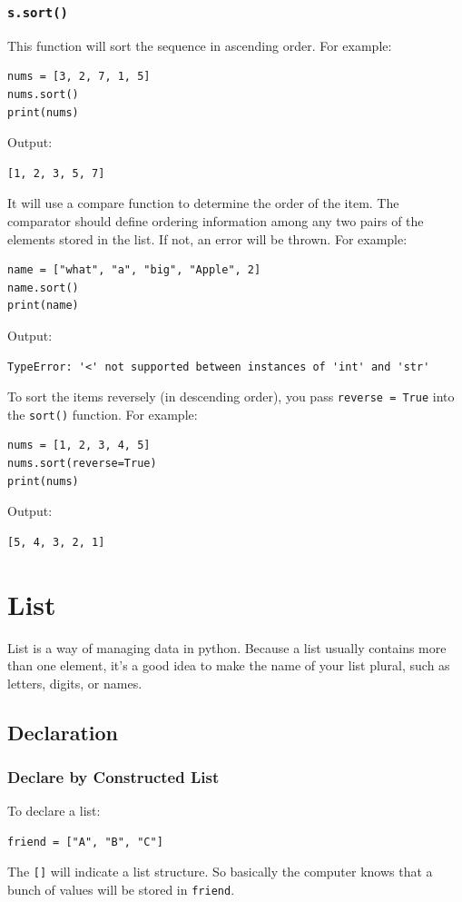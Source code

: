 \documentclass[12pt]{book}
\begin{document}
\subsubsection{\texttt{s.sort()}}
\label{sec:org6da2622}
This function will sort the sequence in ascending order. For example:
\begin{verbatim}
nums = [3, 2, 7, 1, 5]
nums.sort()
print(nums)
\end{verbatim}
Output:
\begin{verbatim}
[1, 2, 3, 5, 7]
\end{verbatim}

It will use a compare function to determine the order of the item. The comparator should define ordering information among any two pairs of the elements stored in the list. If not, an error will be thrown. For example:
\begin{verbatim}
name = ["what", "a", "big", "Apple", 2]
name.sort()
print(name)
\end{verbatim}
Output:
\begin{verbatim}
TypeError: '<' not supported between instances of 'int' and 'str'
\end{verbatim}

To sort the items reversely (in descending order), you pass \texttt{reverse = True} into the \texttt{sort()} function. For example:
\begin{verbatim}
nums = [1, 2, 3, 4, 5]
nums.sort(reverse=True)
print(nums)
\end{verbatim}
Output:
\begin{verbatim}
[5, 4, 3, 2, 1]
\end{verbatim}
\section{List}
\label{sec:orga586f46}
List is a way of managing data in python. Because a list usually contains more than one element, it’s a good idea to make the name of your list plural, such as letters, digits, or names.
\subsection{Declaration}
\label{sec:org06da90b}
\subsubsection{Declare by Constructed List}
\label{sec:org69545f7}
To declare a list:
\begin{verbatim}
friend = ["A", "B", "C"]
\end{verbatim}
The \texttt{[]} will indicate a list structure. So basically the computer knows that a bunch of values will be stored in \texttt{friend}.
\end{document}
